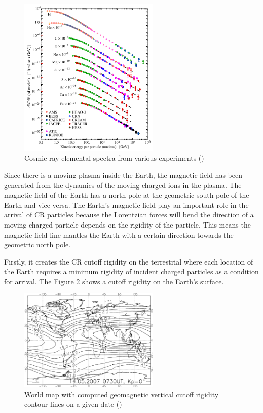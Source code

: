 \begin{figure}[h!]
    \centering
    \includegraphics[width=0.6\textwidth]{content/literature_review/figures/cr_composition.png}
    \caption{Cosmic-ray elemental spectra from various experiments (\cite{review_particle_physics2012})}
    \label{fig:cr_composition}
\end{figure}


Since there is a moving plasma inside the Earth, the magnetic field 
has been generated from the dynamics of the moving charged ions in 
the plasma. The magnetic field of the Earth has a north pole at 
the geometric south pole of the Earth and vice versa. 
The Earth's magnetic field play
an important role in the arrival of CR particles because the Lorentzian 
forces will bend the direction of a moving charged particle depends 
on the rigidity of the particle.
This means the magnetic field line mantles the Earth with a
certain direction towards the geometric north pole.

Firstly, it creates the CR cutoff rigidity on the terrestrial
where each location of the Earth requires a minimum rigidity of incident charged particles as a condition for arrival. The 
Figure \ref{fig:cr_map_rigidity} shows a cutoff rigidity on the Earth's surface.

\begin{figure}[h!]
    \centering
    \includegraphics[width=0.6\textwidth]{content/literature_review/figures/map_cutoff_rigidity.png}
    \caption{ World map with computed geomagnetic vertical cutoff
        rigidity contour lines on a given date
        (\cite{map_cr_rigidity_cutoff})
    }
    \label{fig:cr_map_rigidity}
\end{figure}

